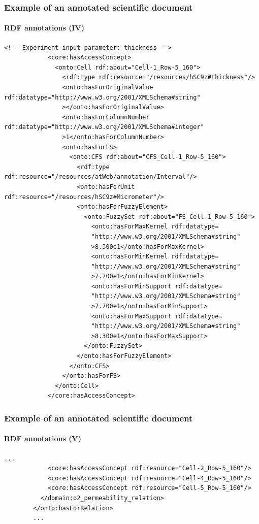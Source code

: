 \documentclass{beamer}
\begin{document}
\begin{frame}[fragile]
  \frametitle{Example of an annotated scientific document}
  \framesubtitle{RDF annotations (IV)}

  \begin{Verbatim}[fontsize=\tiny]
            <!-- Experiment input parameter: thickness -->
            <core:hasAccessConcept>
              <onto:Cell rdf:about="Cell-1_Row-5_160">
                <rdf:type rdf:resource="/resources/hSC9z#thickness"/>
                <onto:hasForOriginalValue rdf:datatype="http://www.w3.org/2001/XMLSchema#string"
                ></onto:hasForOriginalValue>
                <onto:hasForColumnNumber rdf:datatype="http://www.w3.org/2001/XMLSchema#integer"
                >1</onto:hasForColumnNumber>
                <onto:hasForFS>
                  <onto:CFS rdf:about="CFS_Cell-1_Row-5_160">
                    <rdf:type rdf:resource="/resources/atWeb/annotation/Interval"/>
                    <onto:hasForUnit rdf:resource="/resources/hSC9z#Micrometer"/>
                    <onto:hasForFuzzyElement>
                      <onto:FuzzySet rdf:about="FS_Cell-1_Row-5_160">
                        <onto:hasForMaxKernel rdf:datatype=
                        "http://www.w3.org/2001/XMLSchema#string"
                        >8.300e1</onto:hasForMaxKernel>
                        <onto:hasForMinKernel rdf:datatype=
                        "http://www.w3.org/2001/XMLSchema#string"
                        >7.700e1</onto:hasForMinKernel>
                        <onto:hasForMinSupport rdf:datatype=
                        "http://www.w3.org/2001/XMLSchema#string"
                        >7.700e1</onto:hasForMinSupport>
                        <onto:hasForMaxSupport rdf:datatype=
                        "http://www.w3.org/2001/XMLSchema#string"
                        >8.300e1</onto:hasForMaxSupport>
                      </onto:FuzzySet>
                    </onto:hasForFuzzyElement>
                  </onto:CFS>
                </onto:hasForFS>
              </onto:Cell>
            </core:hasAccessConcept>
  \end{Verbatim}
\end{frame}

\begin{frame}[fragile]
  \frametitle{Example of an annotated scientific document}
  \framesubtitle{RDF annotations (V)}

  \begin{Verbatim}[fontsize=\tiny]
            ...
            <core:hasAccessConcept rdf:resource="Cell-2_Row-5_160"/>
            <core:hasAccessConcept rdf:resource="Cell-4_Row-5_160"/>
            <core:hasAccessConcept rdf:resource="Cell-5_Row-5_160"/>
          </domain:o2_permeability_relation>
        </onto:hasForRelation>
        ...
  \end{Verbatim}
\end{frame}
\end{document}
